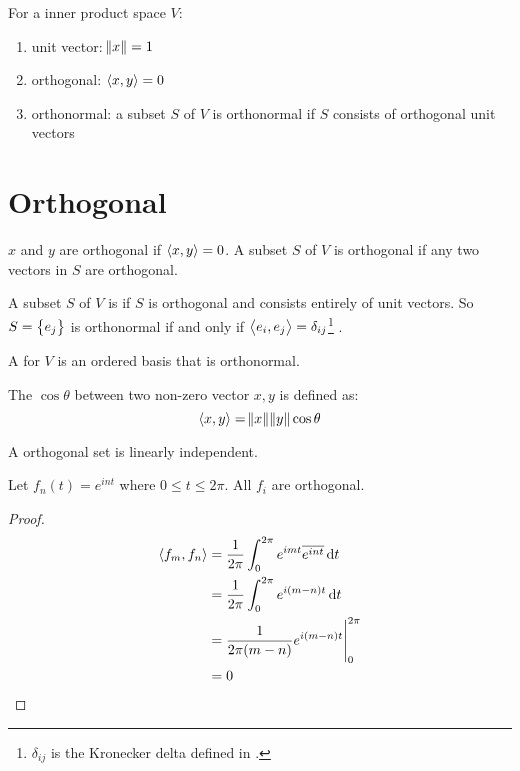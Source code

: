 \begin{definition}
    For a inner product space $V$:
    \begin{enumerate}
        \item unit vector: $\norm{x} =1$
        \item orthogonal: $\innerproduct{x}{y} = 0$
        \item orthonormal: a subset $S$ of $V$ is orthonormal if $S$ consists of orthogonal unit vectors
    \end{enumerate}
\end{definition}

\section{Orthogonal}

\begin{definition}
    $x$ and $y$ are orthogonal if $\innerproduct{x}{y} = 0$. A subset $S$ of $V$ is orthogonal if any two vectors in $S$ are orthogonal. 
    
    A subset $S$ of $V$ is  if $S$ is orthogonal and consists entirely of unit vectors. So $S = \set{e_j}$ is orthonormal if and only if $\innerproduct{e_i}{e_j} = \delta_{ij}$\footnote{$\delta_{ij}$ is the Kronecker delta defined in .} .
    
    A  for $V$ is an ordered basis that is orthonormal.
\end{definition}


\begin{definition}
    The $\cos\theta$ between two non-zero vector $x,y$ is defined as:
    \begin{equation}
        \innerproduct{x}{y} = \norm{x} \norm{y} \cos\theta
    \end{equation}    
\end{definition}


\begin{theorem}
    A orthogonal set is linearly independent.
\end{theorem}


\begin{theorem}
    Let $f_n (t) = e^{i nt}$ where $0 \leq t \leq 2 \pi$. All $f_i$ are orthogonal.
\end{theorem}
\begin{proof}
    \begin{equation}
        \begin{aligned}
            \innerproduct{f_m}{f_n} &= \frac{1}{2 \pi} \int_0^{2 \pi} e^{imt} \overline{e^{int}} \dif{t} \\
            &= \frac{1}{2\pi} \int_0^{2\pi} e^{i (m-n) t} \dif{t} \\
            &= \eval{\frac{1}{2\pi (m-n)} e^{i(m-n)t}}_0^{2\pi} \\
            &= 0
        \end{aligned}
    \end{equation}
\end{proof}


